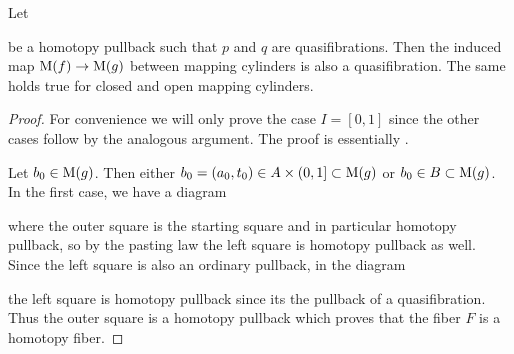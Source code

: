 \begin{lemma}\label{lem:mapOfCylIsQuasiFib}
    Let 
    \begin{center}
    \end{center}
    be a homotopy pullback such that $p$ and $q$ are quasifibrations.
    Then the induced map $\operatorname{M}(f)\to\operatorname{M}(g)$ between mapping cylinders is also a quasifibration.
    The same holds true for closed and open mapping cylinders.
    \begin{proof}
        For convenience we will only prove the case $I=[0,1]$ since the other cases follow by the analogous argument.
        The proof is essentially \cite[Lemma 5.10.6]{cubical_htpy_theory}.

        Let $b_0\in\operatorname{M}(g)$. 
        Then either $b_0=(a_0,t_0)\in A\times(0,1]\subset\operatorname{M}(g)$ or $b_0\in B\subset\operatorname{M}(g)$.
        In the first case, we have a diagram
        \begin{center}
        \end{center}
        where the outer square is the starting square and in particular homotopy pullback, so by the pasting law the left square is homotopy pullback as well.
        Since the left square is also an ordinary pullback, in the diagram
        \begin{center}
        \end{center}
        the left square is homotopy pullback since its the pullback of a quasifibration.
        Thus the outer square is a homotopy pullback which proves that the fiber $F$ is a homotopy fiber.


\end{proof}
\end{lemma}
